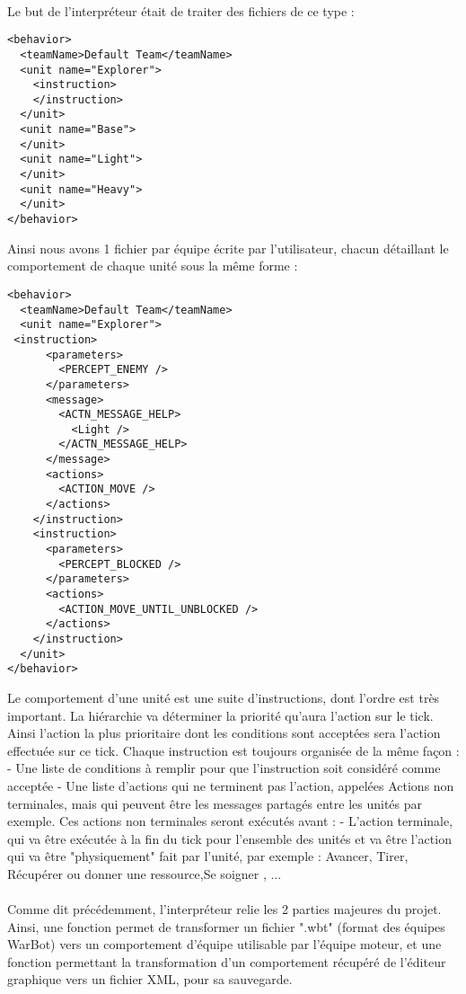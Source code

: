 \documentclass{report}
\begin{document}
\paragraph{}
Le but de l'interpréteur était de traiter des fichiers de ce type :
\begin{lstlisting}
<behavior>
  <teamName>Default Team</teamName>
  <unit name="Explorer">
    <instruction>
    </instruction>
  </unit>
  <unit name="Base">
  </unit>
  <unit name="Light">
  </unit>
  <unit name="Heavy">
  </unit>
</behavior>
\end{lstlisting}
Ainsi nous avons 1 fichier par équipe écrite par l'utilisateur, chacun détaillant le comportement de chaque unité sous la même forme :
\begin{lstlisting}
<behavior>
  <teamName>Default Team</teamName>
  <unit name="Explorer">
 <instruction>
      <parameters>
        <PERCEPT_ENEMY />
      </parameters>
      <message>
        <ACTN_MESSAGE_HELP>
          <Light />
        </ACTN_MESSAGE_HELP>
      </message>
      <actions>
        <ACTION_MOVE />
      </actions>
    </instruction>
    <instruction>
      <parameters>
        <PERCEPT_BLOCKED />
      </parameters>
      <actions>
        <ACTION_MOVE_UNTIL_UNBLOCKED />
      </actions>
    </instruction>
  </unit>
</behavior>
\end{lstlisting}
Le comportement d'une unité est une suite d'instructions, dont l'ordre est très important. La hiérarchie va déterminer la priorité qu'aura l'action sur le tick. Ainsi l'action la plus prioritaire dont les conditions sont acceptées sera l'action effectuée sur ce tick.
Chaque instruction est toujours organisée de la même façon :
- Une liste de conditions à remplir pour que l'instruction soit considéré comme acceptée
- Une liste d'actions qui ne terminent pas l'action, appelées Actions non terminales, mais qui peuvent être les messages partagés entre les unités par exemple. Ces actions non terminales seront exécutés avant :
- L'action terminale, qui va être exécutée à la fin du tick pour l'ensemble des unités et va être l'action qui va être "physiquement" fait par l'unité, par exemple : Avancer, Tirer, Récupérer ou donner une ressource,Se soigner , ...
\paragraph{}
Comme dit précédemment, l'interpréteur relie les 2 parties majeures du projet.
Ainsi, une fonction permet de transformer un fichier ".wbt" (format des équipes WarBot) vers un comportement d'équipe utilisable par l'équipe moteur, et une fonction permettant la transformation d'un comportement récupéré de l'éditeur graphique vers un fichier XML, pour sa sauvegarde.
\newpage
\end{document}
